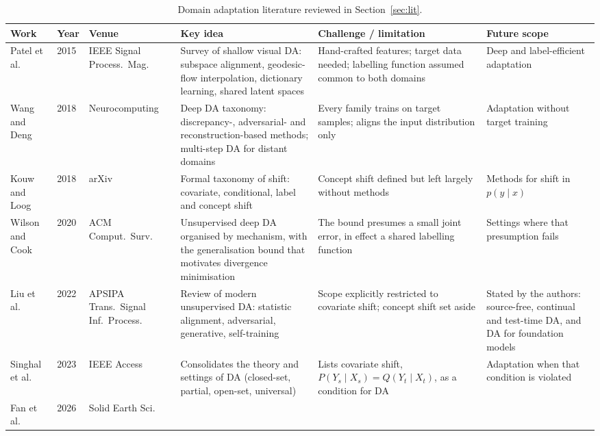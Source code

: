 \documentclass[a4paper,fleqn]{cas-sc}
\begin{document}
\begin{table}[width=\linewidth,cols=6,pos=htbp]
\caption{Domain adaptation literature reviewed in Section~\ref{sec:lit}.}
\label{tbl:lit-da}
\footnotesize
\begin{tabularx}{\linewidth}{@{}W{2.1cm} l W{1.7cm} Z Z Z@{}}
\toprule
\textbf{Work} & \textbf{Year} & \textbf{Venue} & \textbf{Key idea} &
\textbf{Challenge / limitation} & \textbf{Future scope} \\
\midrule
Patel et al. \citep{patel2015visual} & 2015 & IEEE Signal Process.\ Mag. &
Survey of shallow visual DA: subspace alignment, geodesic-flow interpolation,
dictionary learning, shared latent spaces &
Hand-crafted features; target data needed; labelling function assumed common to
both domains &
Deep and label-efficient adaptation \\
\addlinespace
Wang and Deng \citep{wang2018deep} & 2018 & Neurocomputing &
Deep DA taxonomy: discrepancy-, adversarial- and reconstruction-based methods;
multi-step DA for distant domains &
Every family trains on target samples; aligns the input distribution only &
Adaptation without target training \\
\addlinespace
Kouw and Loog \citep{kouw2018introduction} & 2018 & arXiv &
Formal taxonomy of shift: covariate, conditional, label and concept shift &
Concept shift defined but left largely without methods &
Methods for shift in $p(y \mid x)$ \\
\addlinespace
Wilson and Cook \citep{wilson2020survey} & 2020 & ACM Comput.\ Surv. &
Unsupervised deep DA organised by mechanism, with the generalisation bound that
motivates divergence minimisation &
The bound presumes a small joint error, in effect a shared labelling function &
Settings where that presumption fails \\
\addlinespace
Liu et al. \citep{liu2022deep} & 2022 & APSIPA Trans.\ Signal Inf.\ Process. &
Review of modern unsupervised DA: statistic alignment, adversarial, generative,
self-training &
Scope explicitly restricted to covariate shift; concept shift set aside &
Stated by the authors: source-free, continual and test-time DA, and DA for
foundation models \\
\addlinespace
Singhal et al. \citep{singhal2023domain} & 2023 & IEEE Access &
Consolidates the theory and settings of DA (closed-set, partial, open-set,
universal) &
Lists covariate shift, $P(Y_s \mid X_s) = Q(Y_t \mid X_t)$, as a condition for DA
&
Adaptation when that condition is violated \\
\addlinespace
Fan et al. \citep{fan2026llm} & 2026 & Solid Earth Sci. &

\end{tabularx}
\end{table}
\end{document}
